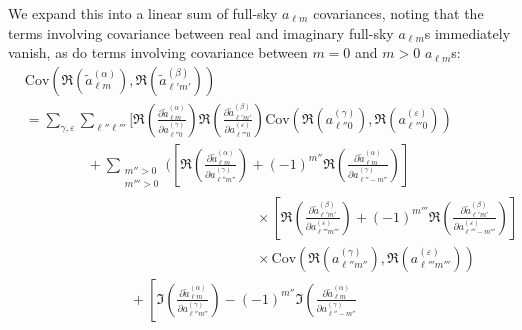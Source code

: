 We expand this into a linear sum of full-sky $a_{\ell m}$ covariances, noting that the terms involving covariance between real and imaginary full-sky $a_{\ell m}$s immediately vanish, as do terms involving covariance between $m = 0$ and $m > 0$ $a_{\ell m}$s:
\begin{equation}
\begin{split}
&
\mathrm{Cov} \left(
\Re \left( \widetilde{a}_{\ell m}^{ \left( \alpha \right) } \right),
\Re \left( \widetilde{a}_{\ell' m'}^{ \left( \beta \right) } \right)
\right) \\
&= \sum_{\gamma, \varepsilon}
\sum_{\ell'' \ell'''}
\Bigg[
\Re \left(
\frac{\partial \widetilde{a}_{\ell m}^{ \left( \alpha \right) }}
{\partial a_{\ell'' 0}^{ \left( \gamma \right) }}
\right)
\Re \left(
\frac{\partial \widetilde{a}_{\ell' m'}^{ \left( \beta \right) }}
{\partial a_{\ell''' 0}^{ \left( \varepsilon \right) }}
\right)
\mathrm{Cov} \left(
\Re \left( a_{\ell'' 0}^{ \left( \gamma \right) } \right),
\Re \left( a_{\ell''' 0}^{ \left( \varepsilon \right) } \right)
\right) \\
&~~~~~~~~~~~~~~~~~~~~ +
\sum_{\substack{m'' > 0 \\ m''' > 0}} \Bigg(
\left[
\Re \left(
\frac{\partial \widetilde{a}_{\ell m}^{ \left( \alpha \right) }}
{\partial a_{\ell'' m''}^{ \left( \gamma \right) }}
\right)
+ \left( -1 \right)^{m''}
\Re \left(
\frac{\partial \widetilde{a}_{\ell m}^{ \left( \alpha \right) }}
{\partial a_{\ell'' -m''}^{ \left( \gamma \right) }}
\right) \right] \\
&~~~~~~~~~~~~~~~~~~~~~~~~~~~~~~~~~~ \qquad\qquad\qquad\qquad\quad \times
\left[
\Re \left(
\frac{\partial \widetilde{a}_{\ell' m'}^{ \left( \beta \right) }}
{\partial a_{\ell''' m'''}^{ \left( \varepsilon \right) }}
\right)
+ \left( -1 \right)^{m'''}
\Re \left(
\frac{\partial \widetilde{a}_{\ell' m'}^{ \left( \beta \right) }}
{\partial a_{\ell''' -m'''}^{ \left( \varepsilon \right) }}
\right) \right]
\\
&~~~~~~~~~~~~~~~~~~~~~~~~~~~~~~~~~~ \qquad\qquad\qquad\qquad\quad \times
\mathrm{Cov} \left(
\Re \left(
a_{\ell'' m''}^{ \left( \gamma \right) }
\right),
\Re \left(
a_{\ell''' m'''}^{ \left( \varepsilon \right) }
\right) \right) \\
&~~~~~~~~~~~~~~~~~~~~~~~~~~~~~~~~~~ +
\left[ \Im \left(
\frac{\partial \widetilde{a}_{\ell m}^{ \left( \alpha \right) }}
{\partial a_{\ell'' m''}^{ \left( \gamma \right) }}
\right)
- \left( -1 \right)^{m''}
\Im \left(
\frac{\partial \widetilde{a}_{\ell m}^{ \left( \alpha \right) }}
{\partial a_{\ell'' -m''}^{ \left( \gamma \right) }}

\end{split}
\end{equation}
